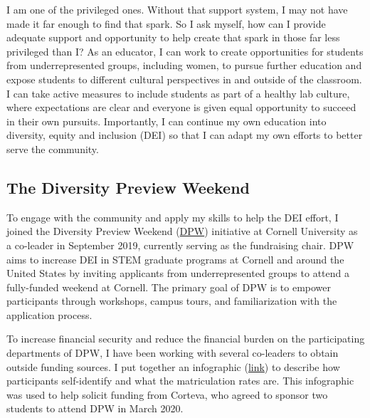 \documentclass[11pt]{article}
\newcommand{\nicholas}[1]{{\color{nicholasCol} [\textbf{NS:} #1 (\today\ \currenttime)]}}
\newcommand{\amy}[1]{{\color{amyCol} [\textbf{Amy:} #1]}}
\begin{document}
I am one of the privileged ones. Without that support system, I may not have made it far enough to find that spark. So I ask myself, how can I provide adequate support and opportunity to help create that spark in those far less privileged than I? As an educator, I can work to create opportunities for students from underrepresented groups, including women, to pursue further education and expose students to different cultural perspectives in and outside of the classroom. I can take active measures to include students as part of a healthy lab culture, where expectations are clear and everyone is given equal opportunity to succeed in their own pursuits. Importantly, I can continue my own education into diversity, equity and inclusion (DEI) so that I can adapt my own efforts to better serve the community. %


\subsection*{The Diversity Preview Weekend}

To engage with the community and apply my skills to help the DEI effort, I joined the Diversity Preview Weekend (\href{https://cornelldpw.org}{DPW}) initiative at Cornell University as a co-leader in September 2019, currently serving as the fundraising chair. DPW aims to increase DEI in STEM graduate programs at Cornell and around the United States by inviting applicants from underrepresented groups to attend a fully-funded weekend at Cornell. The primary goal of DPW is to empower participants through workshops, campus tours, and familiarization with the application process. 

To increase financial security and reduce the financial burden on the participating departments of DPW, I have been working with several co-leaders to obtain outside funding sources. I put together an infographic (\href{https://github.com/nsantantonio/DPWinfographic/blob/master/infoGraphic.pdf}{link}) to describe how participants self-identify and what the matriculation rates are. This infographic was used to help solicit funding from Corteva, who agreed to sponsor two students to attend DPW in March 2020. %
\end{document}
